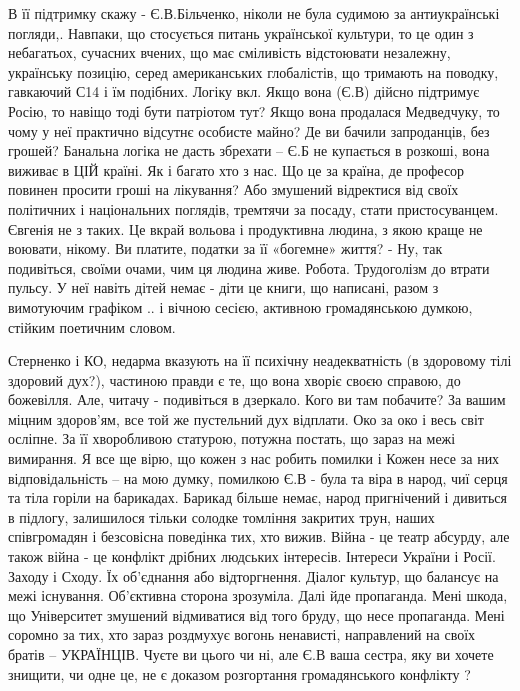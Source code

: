 В її підтримку скажу - Є.В.Більченко, ніколи не була судимою за антиукраїнські
погляди,. Навпаки, що стосується питань української культури, то це один з
небагатьох, сучасних вчених, що має сміливість відстоювати незалежну,
українську позицію, серед американських глобалістів, що тримають на поводку,
гавкаючий С14 і їм подібних. Логіку вкл. Якщо вона (Є.В) дійсно підтримує
Росію, то навіщо тоді бути патріотом тут? Якщо вона продалася Медведчуку, то
чому у неї практично відсутнє особисте майно? Де ви бачили запроданців, без
грошей? Банальна логіка не дасть збрехати – Є.Б не купається в розкоші, вона
виживає в ЦІЙ країні. Як і багато хто з нас. Що це за країна, де професор
повинен просити гроші на лікування? Або змушений відректися від своїх
політичних і національних поглядів, тремтячи за посаду, стати пристосуванцем.
Євгенія не з таких. Це вкрай вольова і продуктивна людина, з якою краще не
воювати, нікому. Ви платите, податки за її «богемне» життя? - Ну, так
подивіться, своїми очами, чим ця людина живе. Робота. Трудоголізм до втрати
пульсу. У неї навіть дітей немає - діти це книги, що написані, разом з
вимотуючим графіком .. і вічною сесією, активною громадянською думкою, стійким
поетичним словом.

Стерненко і КО, недарма вказують на її психічну неадекватність (в здоровому
тілі здоровий дух?), частиною правди є те, що вона хворіє своєю справою, до
божевілля. Але, читачу - подивіться в дзеркало. Кого ви там побачите? За вашим
міцним здоров'ям, все той же пустельний дух відплати. Око за око і весь світ
осліпне. За її хворобливою статурою, потужна постать, що зараз на межі
вимирання. Я все ще вірю, що кожен з нас робить помилки і Кожен несе за них
відповідальність – на мою думку, помилкою Є.В - була та віра в народ, чиї серця
та тіла горіли на барикадах. Барикад більше немає, народ пригнічений і дивиться
в підлогу, залишилося тільки солодке томління закритих трун, наших співгромадян
і безсовісна поведінка тих, хто вижив. Війна - це театр абсурду, але також
війна - це конфлікт дрібних людських інтересів. Інтереси України і Росії.
Заходу і Сходу. Їх об'єднання або відторгнення. Діалог культур, що балансує на
межі існування. Об'єктивна сторона зрозуміла. Далі йде пропаганда. Мені шкода,
що Університет змушений відмиватися від того бруду, що несе пропаганда. Мені
соромно за тих, хто зараз роздмухує вогонь ненависті, направлений на своїх
братів – УКРАЇНЦІВ. Чуєте ви цього чи ні, але Є.В ваша сестра, яку ви хочете
знищити, чи одне це, не є доказом розгортання громадянського конфлікту ? 

